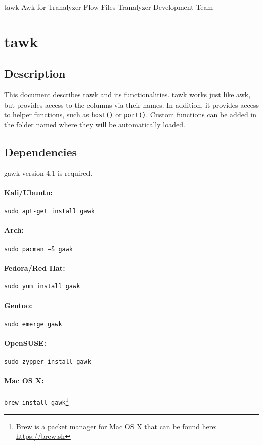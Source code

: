 \documentclass[documentation]{subfiles}
\begin{document}
\trantitle
    {tawk}
    {Awk for Tranalyzer Flow Files}
    {Tranalyzer Development Team} %

\section{tawk}\label{s:tawk}

\subsection{Description}
This document describes tawk and its functionalities.
tawk works just like awk, but provides access to the columns via their names.
In addition, it provides access to helper functions, such as {\tt host()} or {\tt port()}.
Custom functions can be added in the folder named {\tt{}} where they will be automatically loaded.

\subsection{Dependencies}
gawk version 4.1 is required.

\paragraph{Kali/Ubuntu:} {\tt sudo apt-get install gawk}
\paragraph{Arch:} {\tt sudo pacman --S gawk}
\paragraph{Fedora/Red Hat:} {\tt sudo yum install gawk}
\paragraph{Gentoo:} {\tt sudo emerge gawk}
\paragraph{OpenSUSE:} {\tt sudo zypper install gawk}
\paragraph{Mac OS X:} {\tt brew install gawk}\footnote{Brew is a packet manager for Mac OS X that can be found here: \url{https://brew.sh}}
\end{document}

